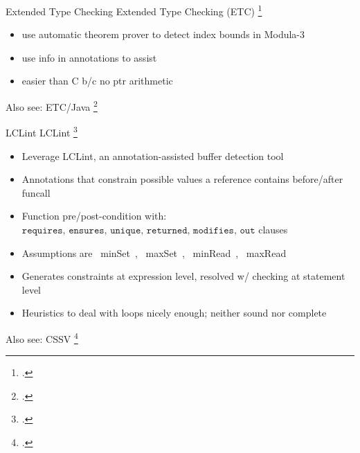 \documentclass[aspectratio=169]{beamer}
\begin{document}
\begin{frame}[fragile]{Extended Type Checking}
Extended Type Checking (ETC) \footcite{detlefs_overview_1995}
    \begin{itemize}
      \item use automatic theorem prover to detect index bounds in Modula-3
      \item use info in annotations to assist
      \item easier than C b/c no ptr arithmetic
    \end{itemize}
Also see: ETC/Java \footcite{flanagan_extended_2002}
\end{frame}

\begin{frame}[fragile]{LCLint}
LCLint \footcite{larochelle_statically_2001}
\begin{itemize}
    \item Leverage LCLint, an annotation-assisted buffer detection tool
    \item Annotations that constrain possible values a reference contains before/after funcall
    \item Function pre/post-condition with: \footnotesize{$\texttt{requires, ensures, unique, returned, modifies, out}$} clauses
    \item Assumptions are ~minSet~, ~maxSet~, ~minRead~, ~maxRead~
    \item Generates constraints at expression level, resolved w/ checking at statement level
    \item Heuristics to deal with loops nicely enough; neither sound nor complete
\end{itemize}
Also see: CSSV \footcite{dor_cssv:_2003}
    \vspace{0.2in}
\end{frame}

\end{document}
